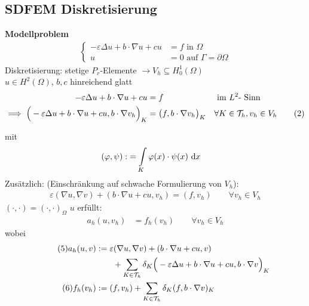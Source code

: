 \subsection{SDFEM Diskretisierung}
\textbf{Modellproblem}
\begin{align}\label{eq7.2_1}\tag{1}
	\left\lbrace\begin{array}{rl}
		-\varepsilon\Delta u+b\cdot\nabla u+cu&=f\text{ in }\Omega\\
		u&=0\text{ auf }\Gamma=\partial\Omega
	\end{array}\right.
\end{align}
Diskretisierung: stetige $P_r$-Elemente $\to V_h\subseteq H_0^1(\Omega)$\\
$u\in H^2(\Omega)$, $b,c$ hinreichend glatt
\begin{align}\nonumber
	-\varepsilon\Delta u+b\cdot \nabla u+cu&= f&&\text{ im }L^2\text{- Sinn}\\
	\implies\Big(-\varepsilon\Delta u+b\cdot\nabla u+cu,b\cdot\nabla v_h\Big)_K&=\big(f,b\cdot\nabla v_h\big)_K
	&&\forall K\in\mathcal{T}_h,v_h\in V_h
	\label{eq7.2_2}\tag{2}
\end{align}

mit 
\begin{align*}
	(\varphi,\psi):&=\int\limits_K\varphi(x)\cdot\psi(x)\text{ d} x
\end{align*}
Zusätzlich: (Einschränkung auf schwache Formulierung von $V_h$):
\begin{align*}\label{eq7.2_3}\tag{3}
	\varepsilon(\nabla u,\nabla v)+(b\cdot\nabla u+ cu,v_h)=(f,v_h)\qquad\forall v_h\in V_h
\end{align*}
$(\cdot,\cdot)=(\cdot,\cdot)_\Omega$\nl
$u$ erfüllt:
\begin{align}\label{eq7.2_4}\tag{4}
	a_h(u,v_h)&=f_h(v_h)\qquad\forall v_h\in V_h
\end{align}
wobei 
\begin{align}\label{eq7.2_5}\tag{5}
	a_h(u,v)&:=\varepsilon(\nabla u,\nabla v)+(b\cdot\nabla u+cu, v)\\\nonumber
	&\qquad+\sum\limits_{K\in\mathcal{T}_h}\delta_K\Big(-\varepsilon\Delta u+b\cdot\nabla u+cu,b\cdot\nabla v\Big)_K\\
	\label{eq7.2_6}\tag{6}
	f_h(v_h)&:=(f,v_h)+\sum\limits_{K\in\mathcal{T}_h}\delta_K(f,b\cdot\nabla v)_K
\end{align}

